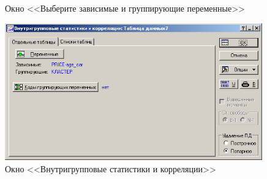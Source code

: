 \begin{figure}[!h]
\begin{minipage}{0.32\textwidth}
    \caption{Окно <<Выберите зависимые и группирующие переменные>>}
    \label{fig:3_10}
  \end{minipage}
  \begin{minipage}{0.32\textwidth}
    \centering

    \includegraphics[width=0.99\textwidth]
    {inc/cars_my/3.11.PNG}

    \caption{Окно <<Внутригрупповые статистики и корреляции>>}
    \label{fig:3_11}
  \end{minipage}
\end{figure}

